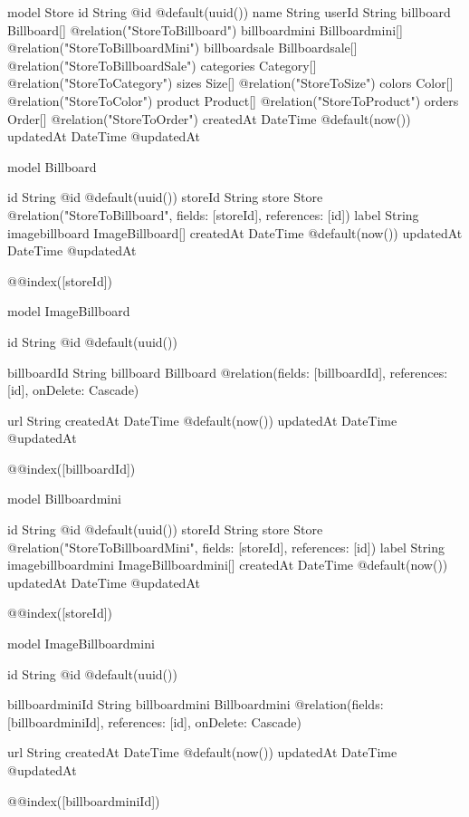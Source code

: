 model Store {
  id            String          @id @default(uuid())
  name          String
  userId        String
  billboard     Billboard[]     @relation("StoreToBillboard")
  billboardmini Billboardmini[] @relation("StoreToBillboardMini")
  billboardsale Billboardsale[] @relation("StoreToBillboardSale")
  categories    Category[]      @relation("StoreToCategory")
  sizes         Size[]          @relation("StoreToSize")
  colors        Color[]         @relation("StoreToColor")
  product       Product[]       @relation("StoreToProduct")
  orders        Order[]         @relation("StoreToOrder")
  createdAt     DateTime        @default(now())
  updatedAt     DateTime        @updatedAt
}

model Billboard {
  id             String           @id @default(uuid())
  storeId        String
  store          Store            @relation("StoreToBillboard", fields: [storeId], references: [id])
  label          String
  imagebillboard ImageBillboard[]
  createdAt      DateTime         @default(now())
  updatedAt      DateTime         @updatedAt

  @@index([storeId])
}

model ImageBillboard {
  id String @id @default(uuid())

  billboardId String
  billboard   Billboard @relation(fields: [billboardId], references: [id], onDelete: Cascade)

  url       String
  createdAt DateTime @default(now())
  updatedAt DateTime @updatedAt

  @@index([billboardId])
}

model Billboardmini {
  id                 String               @id @default(uuid())
  storeId            String
  store              Store                @relation("StoreToBillboardMini", fields: [storeId], references: [id])
  label              String
  imagebillboardmini ImageBillboardmini[]
  createdAt          DateTime             @default(now())
  updatedAt          DateTime             @updatedAt

  @@index([storeId])
}

model ImageBillboardmini {
  id String @id @default(uuid())

  billboardminiId String
  billboardmini   Billboardmini @relation(fields: [billboardminiId], references: [id], onDelete: Cascade)

  url       String
  createdAt DateTime @default(now())
  updatedAt DateTime @updatedAt

  @@index([billboardminiId])
}

